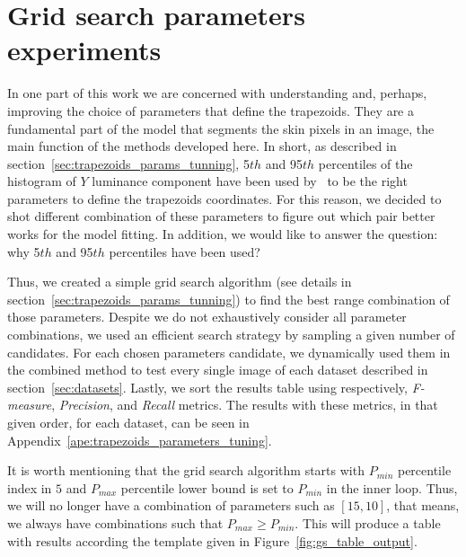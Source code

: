\section{Grid search parameters experiments}
\label{sec:grid_search_experiments}
In one part of this work we are concerned with understanding and, perhaps, improving the choice of parameters that define the trapezoids. They are a fundamental part of the model that segments the skin pixels in an image, the main function of the methods developed here. In short, as described in section~\ref{sec:trapezoids_params_tunning}, 5${th}$ and 95$th$ percentiles of the histogram of $Y$ luminance component have been used by~\citet{brancati:17} to be the right parameters to define the trapezoids coordinates. For this reason, we decided to shot different combination of these parameters to figure out which pair better works for the model fitting. In addition, we would like to answer the question: why 5${th}$ and 95$th$ percentiles have been used?

Thus, we created a simple grid search algorithm (see details in section~\ref{sec:trapezoids_params_tunning}) to find the best range combination of those parameters. Despite we do not exhaustively consider all parameter combinations, we used an efficient search strategy by sampling a given number of candidates. For each chosen parameters candidate, we dynamically used them in the combined method to test every single image of each dataset described in section~\ref{sec:datasets}. Lastly, we sort the results table using respectively, \emph{F-measure}, \emph{Precision}, and \emph{Recall} metrics. The results with these metrics, in that given order, for each dataset, can be seen in Appendix~\ref{ape:trapezoids_parameters_tuning}.

It is worth mentioning that the grid search algorithm starts with $P_{min}$ percentile index in $5$ and $P_{max}$ percentile lower bound is set to $P_{min}$ in the inner loop. Thus, we will no longer have a combination of parameters such as $[15, 10]$, that means, we always have combinations such that $P_{max} \geq P_{min}$. This will produce a table with results according the template given in Figure~\ref{fig:gs_table_output}.


